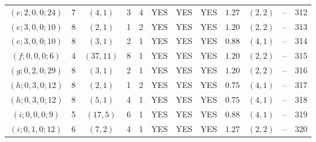 \begin{longtable}{|c|c|c|c|c|c|c|c|c|c|c|c|}
$(e;2,0,0;24)$ & 7 & $(4,1)$ & 3 & 4 & YES & YES & YES & $1.27$ & $(2,2)$ & -- & 312\\
$(e;3,0,0;10)$ & 8 & $(2,1)$ & 1 & 2 & YES & YES & YES & $1.20$ & $(2,2)$ & -- & 313\\
$(e;3,0,0;10)$ & 8 & $(3,1)$ & 2 & 1 & YES & YES & YES & $0.88$ & $(4,1)$ & -- & 314\\
$(f;0,0,0;6)$ & 4 & $(37,11)$ & 8 & 1 & YES & YES & YES & $1.20$ & $(2,2)$ & -- & 315\\
$(g;0,2,0;29)$ & 8 & $(3,1)$ & 2 & 1 & YES & YES & YES & $1.20$ & $(2,2)$ & -- & 316\\
$(h;0,3,0;12)$ & 8 & $(2,1)$ & 1 & 2 & YES & YES & YES & $0.75$ & $(4,1)$ & -- & 317\\
$(h;0,3,0;12)$ & 8 & $(5,1)$ & 4 & 1 & YES & YES & YES & $0.75$ & $(4,1)$ & -- & 318\\
$(i;0,0,0;9)$ & 5 & $(17,5)$ & 6 & 1 & YES & YES & YES & $0.88$ & $(4,1)$ & -- & 319\\
$(i;0,1,0;12)$ & 6 & $(7,2)$ & 4 & 1 & YES & YES & YES & $1.27$ & $(2,2)$ & -- & 320
\end{longtable}
